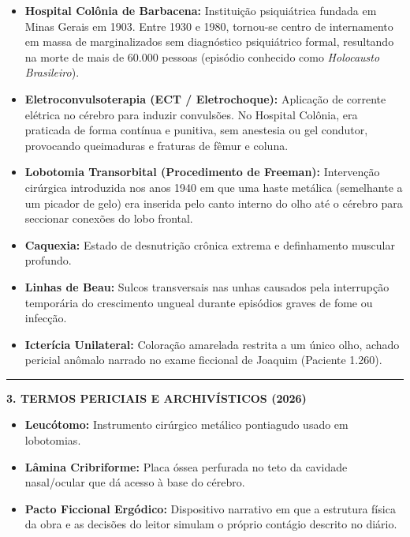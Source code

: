 \vspace{0.4em}
\begin{itemize}[itemsep=0.2em]
  \item \textbf{Hospital Colônia de Barbacena:} Instituição psiquiátrica fundada em Minas Gerais em 1903. Entre 1930 e 1980, tornou-se centro de internamento em massa de marginalizados sem diagnóstico psiquiátrico formal, resultando na morte de mais de 60.000 pessoas (episódio conhecido como \textit{Holocausto Brasileiro}).
  \item \textbf{Eletroconvulsoterapia (ECT / Eletrochoque):} Aplicação de corrente elétrica no cérebro para induzir convulsões. No Hospital Colônia, era praticada de forma contínua e punitiva, sem anestesia ou gel condutor, provocando queimaduras e fraturas de fêmur e coluna.
  \item \textbf{Lobotomia Transorbital (Procedimento de Freeman):} Intervenção cirúrgica introduzida nos anos 1940 em que uma haste metálica (semelhante a um picador de gelo) era inserida pelo canto interno do olho até o cérebro para seccionar conexões do lobo frontal.
  \item \textbf{Caquexia:} Estado de desnutrição crônica extrema e definhamento muscular profundo.
  \item \textbf{Linhas de Beau:} Sulcos transversais nas unhas causados pela interrupção temporária do crescimento ungueal durante episódios graves de fome ou infecção.
  \item \textbf{Icterícia Unilateral:} Coloração amarelada restrita a um único olho, achado pericial anômalo narrado no exame ficcional de Joaquim (Paciente 1.260).
\end{itemize}

\vspace{0.8em}
\noindent\rule{\textwidth}{0.5pt}
\vspace{0.6em}

\noindent\textbf{3. TERMOS PERICIAIS E ARCHIVÍSTICOS (2026)}

\vspace{0.4em}
\begin{itemize}[itemsep=0.2em]
  \item \textbf{Leucótomo:} Instrumento cirúrgico metálico pontiagudo usado em lobotomias.
  \item \textbf{Lâmina Cribriforme:} Placa óssea perfurada no teto da cavidade nasal/ocular que dá acesso à base do cérebro.
  \item \textbf{Pacto Ficcional Ergódico:} Dispositivo narrativo em que a estrutura física da obra e as decisões do leitor simulam o próprio contágio descrito no diário.
\end{itemize}

\endgroup
\clearpage
